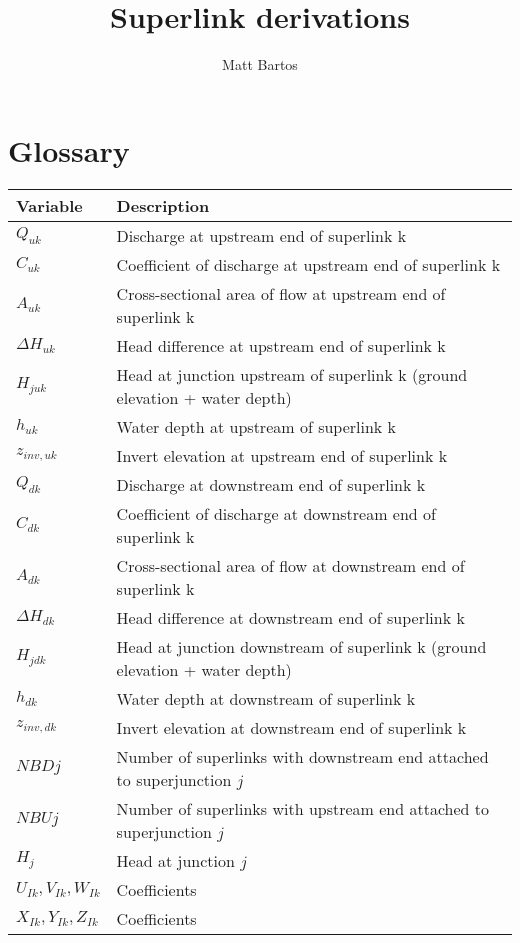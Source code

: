 \documentclass[11pt]{article}
\title{Superlink derivations}
\author{Matt Bartos}
\date{}
\begin{document}
\section*{Glossary}

\begin{table}[!htb]
  \centering
  \begin{tabular}{l | l}
    \hline
    Variable & Description \\
    \hline
    $Q_{uk}$ & Discharge at upstream end of superlink k \\
    $C_{uk}$ & Coefficient of discharge at upstream end of superlink k \\
    $A_{uk}$ & Cross-sectional area of flow at upstream end of superlink k \\
    $\Delta H_{uk}$ & Head difference at upstream end of superlink k \\
    $H_{juk}$ & Head at junction upstream of superlink k (ground elevation + water depth) \\
    $h_{uk}$ & Water depth at upstream of superlink k \\
    $z_{inv, uk}$ & Invert elevation at upstream end of superlink k \\
    $Q_{dk}$ & Discharge at downstream end of superlink k \\
    $C_{dk}$ & Coefficient of discharge at downstream end of superlink k \\
    $A_{dk}$ & Cross-sectional area of flow at downstream end of superlink k \\
    $\Delta H_{dk}$ & Head difference at downstream end of superlink k \\
    $H_{jdk}$ & Head at junction downstream of superlink k (ground elevation + water depth) \\
    $h_{dk}$ & Water depth at downstream of superlink k \\
    $z_{inv, dk}$ & Invert elevation at downstream end of superlink k \\
    $NBDj$ & Number of superlinks with downstream end attached to superjunction $j$ \\
    $NBUj$ & Number of superlinks with upstream end attached to superjunction $j$ \\
    $H_j$ & Head at junction $j$ \\
    $U_{Ik}, V_{Ik}, W_{Ik}$ & Coefficients \\
    $X_{Ik}, Y_{Ik}, Z_{Ik}$ & Coefficients \\
    \hline
  \end{tabular}
\end{table}
\end{document}
